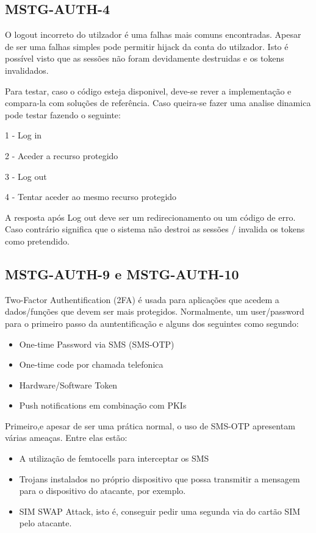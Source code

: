 \subsection{MSTG-AUTH-4}

O logout incorreto do utilzador é uma falhas mais comuns encontradas. Apesar de ser uma falhas simples pode permitir hijack da conta do utilzador. Isto é possível visto que as sessões não foram devidamente destruidas e os tokens invalidados.

Para testar, caso o código esteja disponivel, deve-se rever a implementação e compara-la com soluções de referência. Caso queira-se fazer uma analise dinamica pode testar fazendo o seguinte:

1 - Log in

2 - Aceder a recurso protegido

3 - Log out

4 - Tentar aceder ao mesmo recurso protegido

A resposta após Log out deve ser um redirecionamento ou um código de erro. Caso contrário significa que o sistema não destroi as sessões / invalida os tokens como pretendido.

\subsection{MSTG-AUTH-9 e MSTG-AUTH-10}

Two-Factor Authentification (2FA) é usada para aplicações que acedem a dados/funções que devem ser mais protegidos. Normalmente, um user/password para o primeiro passo da auntentificação e alguns dos seguintes como segundo:
\begin{itemize}

\item One-time Password via SMS (SMS-OTP)
\item One-time code por chamada telefonica
\item Hardware/Software Token
\item Push notifications em combinação com PKIs

\end{itemize}

Primeiro,e apesar de ser uma prática normal, o uso de SMS-OTP apresentam várias ameaças. Entre elas estão:

\begin{itemize}	

\item A utilização de femtocells para interceptar os SMS

\item Trojans instalados no próprio dispositivo que possa transmitir a mensagem para o dispositivo do atacante, por exemplo.

\item SIM SWAP Attack, isto é, conseguir pedir uma segunda via do cartão SIM pelo atacante.

\end{itemize}

